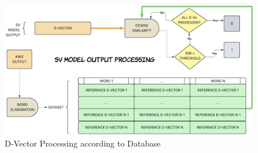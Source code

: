 \begin{center}
    \centering
    \begin{figure}[!h]
        \includegraphics[width=1.0\textwidth]{images/4.04 D-Vector Processing.png}
        \caption{D-Vector Processing according to Database}
    \end{figure}
\end{center}
